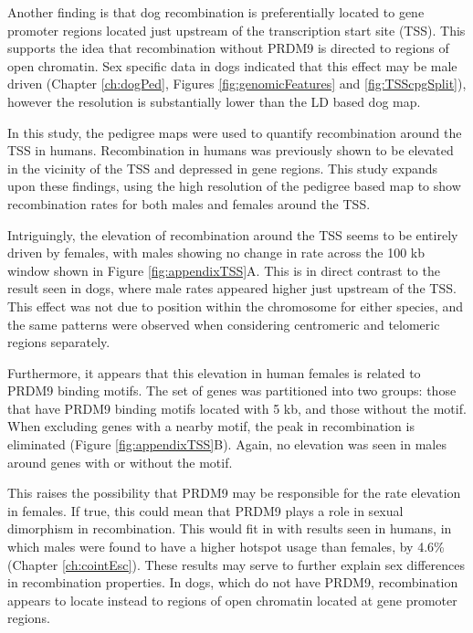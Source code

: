 Another finding is that dog recombination is preferentially located to gene promoter regions located just upstream of the transcription start site (TSS)\cite{Auton2013}.
This supports the idea that recombination without PRDM9 is directed to regions of open chromatin.
Sex specific data in dogs indicated that this effect may be male driven (Chapter \ref{ch:dogPed}, Figures \ref{fig:genomicFeatures} and \ref{fig:TSScpgSplit}), however the resolution is substantially lower than the LD based dog map.

In this study, the pedigree maps were used to quantify recombination around the TSS in humans.
Recombination in humans was previously shown to be elevated in the vicinity of the TSS and depressed in gene regions\cite{Mcvean2004,Myers2005,hapmap2007,Kong2010}.
This study expands upon these findings, using the high resolution of the pedigree based map to show recombination rates for both males and females around the TSS.

Intriguingly, the elevation of recombination around the TSS seems to be entirely driven by females, with males showing no change in rate across the 100 kb window shown in Figure \ref{fig:appendixTSS}A.
This is in direct contrast to the result seen in dogs, where male rates appeared higher just upstream of the TSS.
This effect was not due to position within the chromosome for either species, and the same patterns were observed when considering centromeric and telomeric regions separately.

Furthermore, it appears that this elevation in human females is related to PRDM9 binding motifs.
The set of genes was partitioned into two groups: those that have PRDM9 binding motifs located with 5 kb, and those without the motif.
When excluding genes with a nearby motif, the peak in recombination is eliminated (Figure \ref{fig:appendixTSS}B).
Again, no elevation was seen in males around genes with or without the motif.

This raises the possibility that PRDM9 may be responsible for the rate elevation in females.
If true, this could mean that PRDM9 plays a role in sexual dimorphism in recombination.
This would fit in with results seen in humans, in which males were found to have a higher hotspot usage than females, by 4.6\% (Chapter \ref{ch:cointEsc}).
These results may serve to further explain sex differences in recombination properties.
In dogs, which do not have PRDM9, recombination appears to locate instead to regions of open chromatin located at gene promoter regions.

